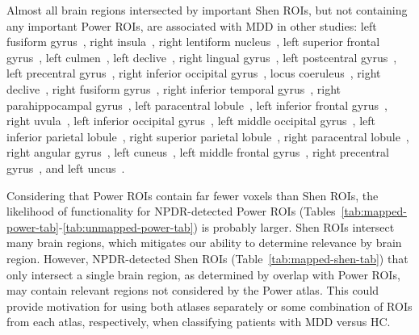 \documentclass[10pt,letterpaper]{article}\usepackage[]{graphicx}\usepackage[]{color}
\begin{document}
Almost all brain regions intersected by important Shen ROIs, but not containing any important Power ROIs, are associated with MDD in other studies: left fusiform gyrus~\cite{iwabuchi2015,kroes2011}, right insula~\cite{avery2014,iwabuchi2014}, right lentiform nucleus~\cite{lui2009,helm2018}, left superior frontal gyrus~\cite{fitzgerald2008,tao2013}, left culmen~\cite{su2014,yamamura2016}, left declive~\cite{su2014,lin2012}, right lingual gyrus~\cite{couvy-duchesne2018,jung2014}, left postcentral gyrus~\cite{zhang2019,schmaal2017}, left precentral gyrus~\cite{tsujii2017,shen2015}, right inferior occipital gyrus~\cite{grieve2013,peterson2009}, locus coeruleus~\cite{wang2017,seki2019}, right declive~\cite{su2014,lin2012}, right fusiform gyrus~\cite{kroes2011,lin2017}, right inferior temporal gyrus~\cite{ramezani2014}, right parahippocampal gyrus~\cite{zamoscik2014,kalsi2017}, left paracentral lobule~\cite{rolls2017,sinha2019}, left inferior frontal gyrus~\cite{tao2013,xu2019}, right uvula~\cite{deldonno2018}, left inferior occipital gyrus~\cite{peterson2009}, left middle occipital gyrus~\cite{ma2019,teng2018}, left inferior parietal lobule~\cite{tu2018,teng2018}, right superior parietal lobule~\cite{zhang2017,chen2015}, right paracentral lobule~\cite{fradkin2017,rolls2017}, right angular gyrus~\cite{tokuda2018,weng2019}, left cuneus~\cite{xu2019,li2018}, left middle frontal gyrus~\cite{fitzgerald2008,zhang2017}, right precentral gyrus~\cite{tsujii2017,peng2015}, and left uncus~\cite{chen2015-2,abe2010}.

Considering that Power ROIs contain far fewer voxels than Shen ROIs, the likelihood of functionality for NPDR-detected Power ROIs (Tables~\ref{tab:mapped-power-tab}-\ref{tab:unmapped-power-tab}) is probably larger. Shen ROIs intersect many brain regions, which mitigates our ability to determine relevance by brain region. However, NPDR-detected Shen ROIs (Table~\ref{tab:mapped-shen-tab}) that only intersect a single brain region, as determined by overlap with Power ROIs, may contain relevant regions not considered by the Power atlas. This could provide motivation for using both atlases separately or some combination of ROIs from each atlas, respectively, when classifying patients with MDD versus HC.
\end{document}
